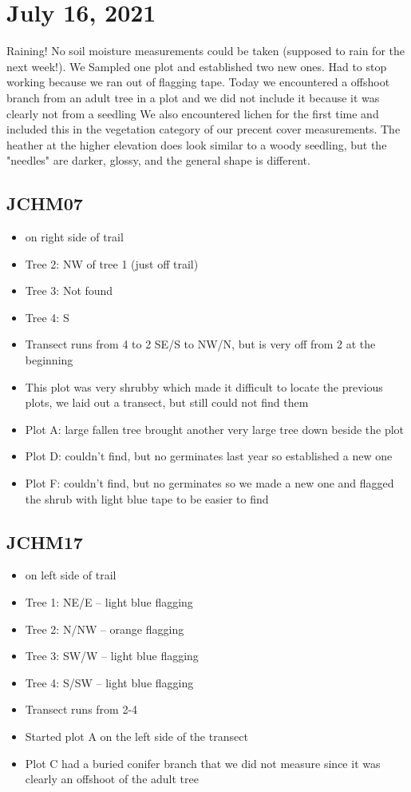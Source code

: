 \documentclass{article}\usepackage[]{graphicx}\usepackage[]{color}
\begin{document}
\section{July 16, 2021}
Raining! No soil moisture measurements could be taken (supposed to rain for the next week!). We Sampled one plot and established two new ones. Had to stop working because we ran out of flagging tape.
Today we encountered a offshoot branch from an adult tree in a plot and we did not include it because it was clearly not from a seedling
We also encountered lichen for the first time and included this in the vegetation category of our precent cover measurements. The heather at the higher elevation does look similar to a woody seedling, but the "needles" are darker, glossy, and the general shape is different.
 
\subsection{JCHM07}
\begin{itemize}
\item on right side of trail
\item Tree 2: NW of tree 1 (just off trail)
\item Tree 3: Not found
\item Tree 4: S
\item Transect runs from 4 to 2 SE/S to NW/N, but is very off from 2 at the beginning 
\item This plot was very shrubby which made it difficult to locate the previous plots, we laid out a transect, but still could not find them
\item Plot A: large fallen tree brought another very large tree down beside the plot
\item Plot D: couldn't find, but no germinates last year so established a new one
\item Plot F: couldn't find, but no germinates so we made a new one and flagged the shrub with light blue tape to be easier to find
\end{itemize}

\subsection{JCHM17}
\begin{itemize}
\item on left side of trail
\item Tree 1: NE/E -- light blue flagging 
\item Tree 2: N/NW -- orange flagging
\item Tree 3: SW/W -- light blue flagging 
\item Tree 4: S/SW -- light blue flagging 
\item Transect runs from 2-4
\item Started plot A on the left side of the transect
\item Plot C had a buried conifer branch that we did not measure since it was clearly an offshoot of the adult tree
\end{itemize}
\end{document}
